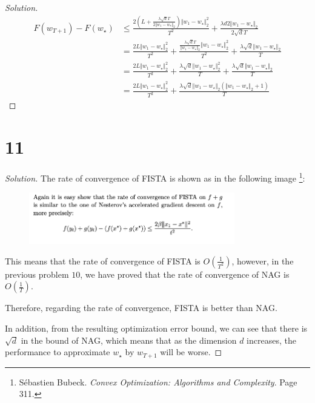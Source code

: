\documentclass{article}
\newenvironment{solution}
  {\renewcommand\qedsymbol{$\blacksquare$}\begin{proof}[Solution]}
  {\end{proof}}
\begin{document}
\begin{solution}
    \begin{align*}
        F(w_{T+1}) - F(w_\star) 
        &\leq \frac{ 2 \left(L + \frac{\lambda \sqrt{d} T}{2 \Vert w_1 - w_\star \Vert_2}\right) \Vert w_1 - w_\star \Vert^2_2}{T^2} 
        + \frac{\lambda d 2 \Vert w_1 - w_\star \Vert_2}{2\sqrt{d} T} \\
        &= \frac{2 L \Vert w_1 - w_\star \Vert^2_2}{T^2} 
        + \frac{\frac{\lambda \sqrt{d} T}{\Vert w_1 - w_\star \Vert_2} \Vert w_1 - w_\star \Vert_2^2}{T^2} 
        + \frac{\lambda \sqrt{d} \Vert w_1 - w_\star \Vert_2}{T} \\
        &= \frac{2 L \Vert w_1 - w_\star \Vert^2_2}{T^2} 
        + \frac{\lambda \sqrt{d} \Vert w_1 - w_\star \Vert_2^2}{T}
        + \frac{\lambda \sqrt{d} \Vert w_1 - w_\star \Vert_2}{T} \\
        &= \frac{2 L \Vert w_1 - w_\star \Vert^2_2}{T^2} 
        + \frac{\lambda \sqrt{d} \Vert w_1 - w_\star \Vert_2 (\Vert w_1 - w_\star \Vert_2 + 1)}{T}
    \end{align*}
\end{solution}

\section*{11}

\begin{solution}
    The rate of convergence of FISTA is shown as in the following image
    \footnote{Sébastien Bubeck. \textit{Convex Optimization: Algorithms and Complexity}. Page 311.}:

    \begin{figure}[H]
        \centering
        \includegraphics[width = 0.8\textwidth]{FISTA.png}
    \end{figure}

    This means that the rate of convergence of FISTA is $O\left(\frac{1}{T^2}\right)$, 
    however, in the previous problem $10$, we have proved that the rate of convergence of NAG is $O\left(\frac{1}{T}\right)$.

    Therefore, regarding the rate of convergence, FISTA is better than NAG.
    \bigskip
    
    In addition, from the resulting optimization error bound, 
    we can see that there is $\sqrt{d}$ in the bound of NAG, 
    which means that as the dimension $d$ increases, the performance to approximate $w_\star$ by $w_{T+1}$ will be worse.
\end{solution}
\end{document}
